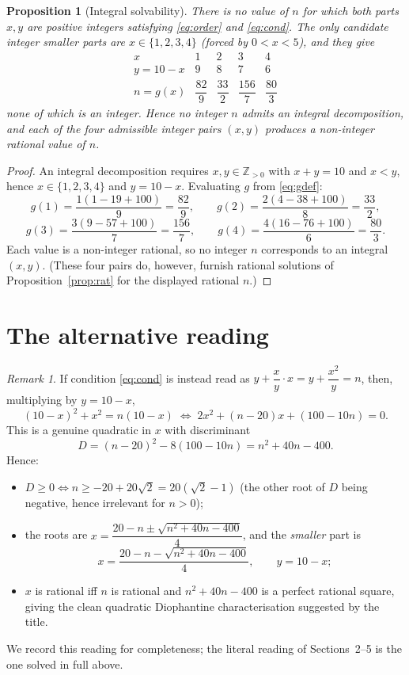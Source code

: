 \documentclass{amsart}
\newtheorem{proposition}{Proposition}
\theoremstyle{remark}
\newtheorem{remark}{Remark}
\begin{document}
\begin{proposition}[Integral solvability]\label{prop:int}
There is \emph{no} value of $n$ for which both parts $x,y$ are positive
integers satisfying \eqref{eq:order} and \eqref{eq:cond}. The only candidate
integer smaller parts are $x\in\{1,2,3,4\}$ (forced by $0<x<5$), and they give
\[
\begin{array}{c|cccc}
x & 1 & 2 & 3 & 4\\\hline
y=10-x & 9 & 8 & 7 & 6\\[2pt]
n=g(x) & \dfrac{82}{9} & \dfrac{33}{2} & \dfrac{156}{7} & \dfrac{80}{3}
\end{array}
\]
none of which is an integer. Hence no integer $n$ admits an integral
decomposition, and each of the four admissible integer pairs $(x,y)$ produces a
non-integer rational value of $n$.
\end{proposition}

\begin{proof}
An integral decomposition requires $x,y\in\mathbb{Z}_{>0}$ with $x+y=10$ and
$x<y$, hence $x\in\{1,2,3,4\}$ and $y=10-x$. Evaluating $g$ from
\eqref{eq:gdef}:
\[
g(1)=\frac{1(1-19+100)}{9}=\frac{82}{9},\qquad
g(2)=\frac{2(4-38+100)}{8}=\frac{33}{2},
\]
\[
g(3)=\frac{3(9-57+100)}{7}=\frac{156}{7},\qquad
g(4)=\frac{4(16-76+100)}{6}=\frac{80}{3}.
\]
Each value is a non-integer rational, so no integer $n$ corresponds to an
integral $(x,y)$. (These four pairs do, however, furnish rational solutions of
Proposition~\ref{prop:rat} for the displayed rational $n$.)
\end{proof}

\section{The alternative reading}\label{sec:alt}

\begin{remark}\label{rem:alt}
If condition \eqref{eq:cond} is instead read as
$y+\dfrac{x}{y}\cdot x=y+\dfrac{x^{2}}{y}=n$, then, multiplying by $y=10-x$,
\[
(10-x)^{2}+x^{2}=n(10-x)
\;\Longleftrightarrow\;
2x^{2}+(n-20)x+(100-10n)=0 .
\]
This is a genuine quadratic in $x$ with discriminant
\[
D=(n-20)^{2}-8(100-10n)=n^{2}+40n-400 .
\]
Hence:
\begin{itemize}
\item $D\ge0\iff n\ge -20+20\sqrt2=20(\sqrt2-1)$ (the other root of
$D$ being negative, hence irrelevant for $n>0$);
\item the roots are $x=\dfrac{20-n\pm\sqrt{n^{2}+40n-400}}{4}$, and the
\emph{smaller} part is
\[
x=\frac{20-n-\sqrt{n^{2}+40n-400}}{4},\qquad y=10-x;
\]
\item $x$ is rational iff $n$ is rational and $n^{2}+40n-400$ is a perfect
rational square, giving the clean quadratic Diophantine characterisation
suggested by the title.
\end{itemize}
We record this reading for completeness; the literal reading of
Sections~2--5 is the one solved in full above.
\end{remark}
\end{document}
